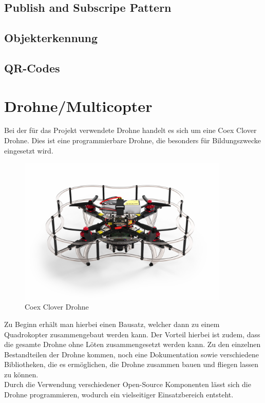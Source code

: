     \subsection{Publish and Subscripe Pattern}

    \subsection{Objekterkennung}

    \subsection{QR-Codes}

\section{Drohne/Multicopter}
Bei der für das Projekt verwendete Drohne handelt es sich um eine Coex Clover Drohne. Dies ist eine programmierbare Drohne, die besonders für Bildungszwecke eingesetzt wird. \\

\begin{figure}[htpb]
    \centering
    \includegraphics[width=10cm,keepaspectratio,angle=0]{images/coex_clover.jpg}
    \caption[Coex Clover Drohne]{\label{img coex_clover} Coex Clover Drohne \cite{img_coex_clover}}
\end{figure}

Zu Beginn erhält man hierbei einen Bausatz, welcher dann zu einem Quadrokopter zusammengebaut werden kann. Der Vorteil hierbei ist zudem, dass die gesamte Drohne ohne Löten zusammengesetzt werden kann. Zu den einzelnen Bestandteilen der Drohne kommen, noch eine Dokumentation sowie verschiedene Bibliotheken, die es ermöglichen, die Drohne zusammen bauen und fliegen lassen zu können. \\
Durch die Verwendung verschiedener Open-Source Komponenten lässt sich die Drohne programmieren, wodurch ein vielseitiger Einsatzbereich entsteht.\\

